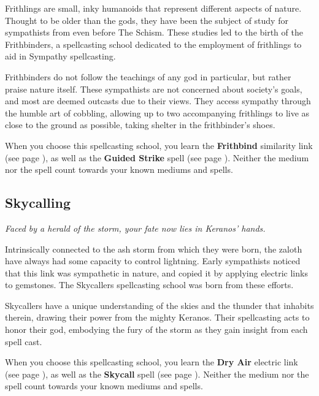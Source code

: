     Frithlings are small, inky humanoids that represent different aspects of nature.
    Thought to be older than the gods, they have been the subject of study for sympathists from even before The Schism.
    These studies led to the birth of the Frithbinders, a spellcasting school dedicated to the employment of frithlings to aid in Sympathy spellcasting.

    Frithbinders do not follow the teachings of any god in particular, but rather praise nature itself.
    These sympathists are not concerned about society's goals, and most are deemed outcasts due to their views.
    They access sympathy through the humble art of cobbling, allowing up to two accompanying frithlings to live as close to the ground as possible, taking shelter in the frithbinder's shoes.

    When you choose this spellcasting school, you learn the \textbf{Frithbind} similarity link (see page \pageref{medium::frithbind}), as well as the \textbf{Guided Strike} spell (see page \pageref{spell::guidedstrike}).
    Neither the medium nor the spell count towards your known mediums and spells.

\subsection*{Skycalling} \label{ssec::skycalling} %
    \textit{Faced by a herald of the storm, your fate now lies in Keranos' hands.}

    Intrinsically connected to the ash storm from which they were born, the zaloth have always had some capacity to control lightning.
    Early sympathists noticed that this link was sympathetic in nature, and copied it by applying electric links to gemstones.
    The Skycallers spellcasting school was born from these efforts.

    Skycallers have a unique understanding of the skies and the thunder that inhabits therein, drawing their power from the mighty Keranos.
    Their spellcasting acts to honor their god, embodying the fury of the storm as they gain insight from each spell cast.

    When you choose this spellcasting school, you learn the \textbf{Dry Air} electric link (see page \pageref{medium::dryair}), as well as the \textbf{Skycall} spell (see page \pageref{spell::skycall}).
    Neither the medium nor the spell count towards your known mediums and spells.

\newpage
